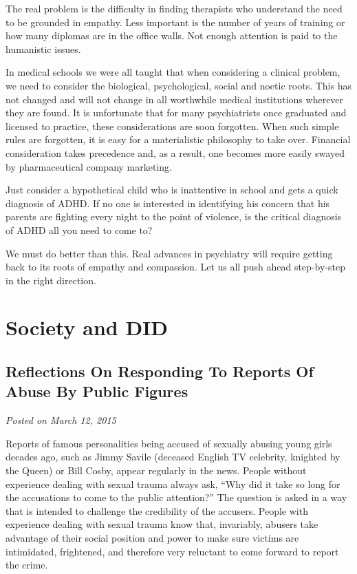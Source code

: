\documentclass[]{book}
\begin{document}
The real problem is the difficulty in finding therapists who understand the need to be grounded in empathy. Less important is the number of years of training or how many diplomas are in the office walls. Not enough attention is paid to the humanistic issues.

In medical schools we were all taught that when considering a clinical problem, we need to consider the biological, psychological, social and noetic roots. This has not changed and will not change in all worthwhile medical institutions wherever they are found. It is unfortunate that for many psychiatrists once graduated and licensed to practice, these considerations are soon forgotten. When such simple rules are forgotten, it is easy for a materialistic philosophy to take over. Financial consideration takes precedence and, as a result, one becomes more easily swayed by pharmaceutical company marketing.

Just consider a hypothetical child who is inattentive in school and gets a quick diagnosis of ADHD. If no one is interested in identifying his concern that his parents are fighting every night to the point of violence, is the critical diagnosis of ADHD all you need to come to?

We must do better than this. Real advances in psychiatry will require getting back to its roots of empathy and compassion. Let us all push ahead step-by-step in the right direction.

\hypertarget{society-and-did}{%
\chapter{Society and DID}\label{society-and-did}}

\hypertarget{reflections-on-responding-to-reports-of-abuse-by-public-figures}{%
\section{Reflections On Responding To Reports Of Abuse By Public Figures}\label{reflections-on-responding-to-reports-of-abuse-by-public-figures}}

\emph{Posted on March 12, 2015}

Reports of famous personalities being accused of sexually abusing young girls decades ago, such as Jimmy Savile (deceased English TV celebrity, knighted by the Queen) or Bill Cosby, appear regularly in the news. People without experience dealing with sexual trauma always ask, ``Why did it take so long for the accusations to come to the public attention?'' The question is asked in a way that is intended to challenge the credibility of the accusers. People with experience dealing with sexual trauma know that, invariably, abusers take advantage of their social position and power to make sure victims are intimidated, frightened, and therefore very reluctant to come forward to report the crime.
\end{document}
